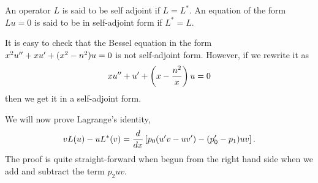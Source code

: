 An operator $L$ is said to be self adjoint if $L = L^\ast$. An equation of the form $Lu = 0$ is said to be in self-adjoint form if $L^\ast = L$.

It is easy to check that the Bessel equation in the form $x^2u^{\prime\prime} + xu^\prime + (x^2 - n^2)u = 0$ is not self-adjoint form. However, if we rewrite it
as 
\begin{equation}\label{mr13e8}
xu^{\prime\prime} + u^\prime + \left(x - \frac{n^2}{x}\right)u = 0
\end{equation}
then we get it in a self-adjoint form.

We will now prove Lagrange's identity,
\begin{equation}\label{mr13e9}
vL(u) - uL^\ast(v) = \frac{d}{dx}\left[p_0(u^\prime v - uv^\prime) - (p_0^\prime - p_1)uv\right].
\end{equation}
The proof is quite straight-forward when begun from the right hand side when we add and subtract the term $p_2uv$.

